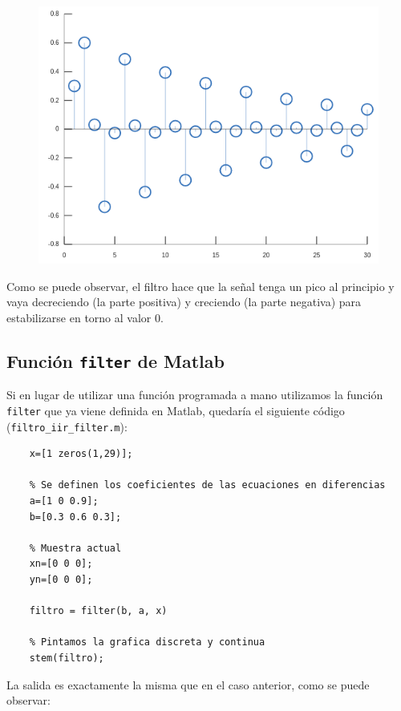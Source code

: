 \documentclass[11pt,a4paper]{article}
\begin{document}
\begin{figure}[H]
	\centering
	\includegraphics[scale=0.5]{img/stem1.png}
\end{figure}

Como se puede observar, el filtro hace que la señal tenga un pico al principio y vaya decreciendo (la parte positiva) y creciendo (la parte negativa) para estabilizarse en torno al valor 0.

\subsection{Función \texttt{filter} de Matlab}

Si en lugar de utilizar una función programada a mano utilizamos la función \texttt{filter} que ya viene definida en Matlab, quedaría el siguiente código (\texttt{filtro\_iir\_filter.m}):

\begin{lstlisting}[frame=single]
	% Se definen los arrays con los pulsos
   	x=[1 zeros(1,29)];
   	
   	% Se definen los coeficientes de las ecuaciones en diferencias
	a=[1 0 0.9];
	b=[0.3 0.6 0.3];
	
	% Muestra actual
	xn=[0 0 0];
	yn=[0 0 0];
	
	filtro = filter(b, a, x)
	
	% Pintamos la grafica discreta y continua
	stem(filtro);
\end{lstlisting}

La salida es exactamente la misma que en el caso anterior, como se puede observar:
\end{document}
